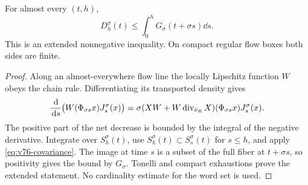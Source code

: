 \begin{proposition}
\label{prop:v76-drift}
For almost every $(t,h)$,
\begin{equation}\label{eq:v76-drift-bound}
 D^\sigma_h(t)\le\int_0^hG_\sigma(t+\sigma s)\dd s.
\end{equation}
This is an extended nonnegative inequality. On compact regular
flow boxes both sides are finite.
\end{proposition}
\begin{proof}
Along an almost-everywhere flow line the locally Lipschitz function
$W$ obeys the chain rule. Differentiating its transported density gives
\[
 \frac{\,\mathrm d}{\,\mathrm d s}\bigl(W(\Phi_{\sigma s}x)J^\sigma_s(x)\bigr)
 =\sigma(XW+W\operatorname{div}_{\bar\nu_R}X)(\Phi_{\sigma s}x)J^\sigma_s(x).
\]
The positive part of the net decrease is bounded by the integral of
the negative derivative. Integrate over $S^\sigma_h(t)$, use
$S^\sigma_h(t)\subset S^\sigma_s(t)$ for $s\le h$, and apply
\eqref{eq:v76-covariance}. The image at time $s$ is a subset of
the full fiber at $t+\sigma s$, so positivity gives the bound by
$G_\sigma$. Tonelli and compact exhaustions prove the extended
statement. No cardinality estimate for the word set is used.
\end{proof}
